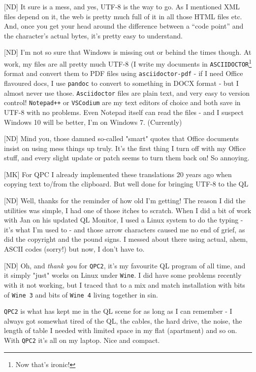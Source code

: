 [ND] It sure is a mess, and yes, UTF-8 is the way to go. As I mentioned XML files depend on it, the web is pretty much full of it in all those HTML files etc. And, once you get your head around the difference between a ``code point'' and the character's actual bytes, it's pretty easy to understand.

[ND] I'm not so sure that Windows is missing out or behind the times though. At work, my files are all pretty much UTF-8 (I write my documents in  \texttt{ASCIIDOCTOR}\footnote{Now that's ironic!} format and convert them to PDF files using  \texttt{asciidoctor-pdf} - if I need Office flavoured docs, I use  \texttt{pandoc} to convert to something in DOCX format - but I almost never use those.  \texttt{Asciidoctor} files are plain text, and very easy to version control!  \texttt{Notepad++} or  \texttt{VSCodium} are my text editors of choice and both save in UTF-8 with no problems. Even Notepad itself can read the files - and I suspect Windows 10 will be better, I'm on Windows 7. (Currently)

[ND] Mind you, those damned so-called "smart" quotes that Office documents insist on using mess things up truly. It's the first thing I turn off with my Office stuff, and every slight update or patch seems to turn them back on! So annoying.

[MK] For QPC I already implemented these translations 20 years ago when
copying text to/from the clipboard. But well done for bringing UTF-8
to the QL 

[ND] Well, thanks for the reminder of how old I'm getting! The reason I did the utilities was simple, I had one of those itches to scratch. When I did a bit of work with Jan on his updated QL Monitor, I used a Linux system to do the typing - it's what I'm used to - and those arrow characters caused me no end of grief, as did the copyright and the pound signs. I messed about there using actual, ahem, ASCII codes (sorry!) but now, I don't have to.

[ND] Oh, and \emph{thank you} for  \texttt{QPC2}, it's my favourite QL program of all time, and it simply "just" works on Linux under  \texttt{Wine}. I did have some problems recently with it not working, but I traced that to a mix and match installation with bits of  \texttt{Wine 3} and bits of  \texttt{Wine 4} living together in sin. 

\texttt{QPC2} is what has kept me in the QL scene for as long as I can remember - I always got somewhat tired of the QL, the cables, the hard drive, the noise, the length of table I needed with limited space in my flat (apartment) and so on. With  \texttt{QPC2} it's all on my laptop. Nice and compact.


